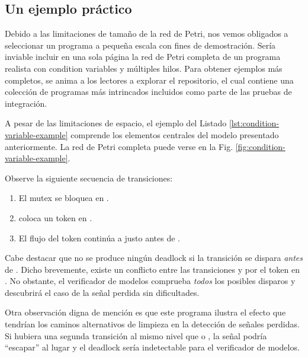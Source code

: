 \subsection{Un ejemplo práctico}

Debido a las limitaciones de tamaño de la red de Petri, nos vemos obligados a seleccionar un
programa a pequeña escala con fines de demostración.
Sería inviable incluir en una sola página
la red de Petri completa de un programa realista con condition variables y múltiples hilos.
Para obtener ejemplos más completos, se anima a los lectores a explorar el repositorio,
el cual contiene una colección de programas más intrincados incluidos como parte de las pruebas de integración.

A pesar de las limitaciones de espacio,
el ejemplo del Listado \ref{lst:condition-variable-example} comprende los elementos
centrales del modelo presentado anteriormente.
La red de Petri completa puede verse en la Fig. \ref{fig:condition-variable-example}.

Observe la siguiente secuencia de transiciones:

\begin{enumerate}
      \item El mutex se bloquea en .
      \item {} coloca un token en .
      \item El flujo del token continúa a  justo antes de .
\end{enumerate}

Cabe destacar que no se produce ningún deadlock si la transición 
se dispara \emph{antes} de .
Dicho brevemente, existe un conflicto entre las transiciones
 y 
por el token en .
No obstante, el verificador de modelos comprueba \emph{todos} los posibles disparos
y descubrirá el caso de la señal perdida sin dificultades.

Otra observación digna de mención es que este programa ilustra
el efecto que tendrían los caminos alternativos
de limpieza en la detección de señales perdidas.
Si hubiera una segunda transición al mismo nivel
que  o ,
la señal podría ``escapar'' al lugar  y
el deadlock sería indetectable para el verificador de modelos.

